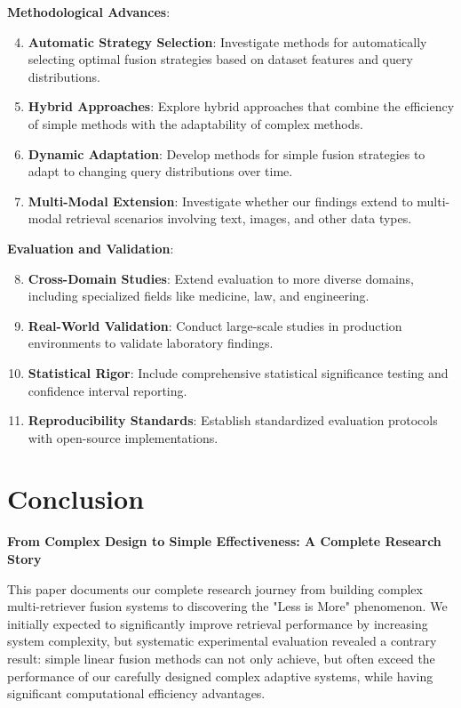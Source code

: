 \documentclass[letterpaper]{article} %
\begin{document}
\textbf{Methodological Advances}:
\begin{enumerate}
\setcounter{enumi}{3}
\item \textbf{Automatic Strategy Selection}: Investigate methods for automatically selecting optimal fusion strategies based on dataset features and query distributions.

\item \textbf{Hybrid Approaches}: Explore hybrid approaches that combine the efficiency of simple methods with the adaptability of complex methods.

\item \textbf{Dynamic Adaptation}: Develop methods for simple fusion strategies to adapt to changing query distributions over time.

\item \textbf{Multi-Modal Extension}: Investigate whether our findings extend to multi-modal retrieval scenarios involving text, images, and other data types.
\end{enumerate}

\textbf{Evaluation and Validation}:
\begin{enumerate}
\setcounter{enumi}{7}
\item \textbf{Cross-Domain Studies}: Extend evaluation to more diverse domains, including specialized fields like medicine, law, and engineering.

\item \textbf{Real-World Validation}: Conduct large-scale studies in production environments to validate laboratory findings.

\item \textbf{Statistical Rigor}: Include comprehensive statistical significance testing and confidence interval reporting.

\item \textbf{Reproducibility Standards}: Establish standardized evaluation protocols with open-source implementations.
\end{enumerate}

\section{Conclusion}

\textbf{From Complex Design to Simple Effectiveness: A Complete Research Story}

This paper documents our complete research journey from building complex multi-retriever fusion systems to discovering the "Less is More" phenomenon. We initially expected to significantly improve retrieval performance by increasing system complexity, but systematic experimental evaluation revealed a contrary result: simple linear fusion methods can not only achieve, but often exceed the performance of our carefully designed complex adaptive systems, while having significant computational efficiency advantages.
\end{document}
